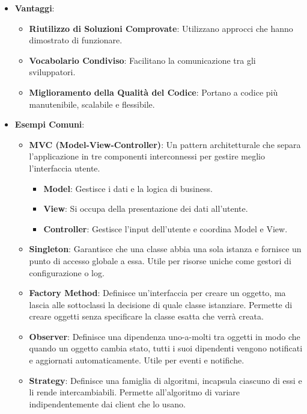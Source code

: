 \begin{itemize}
    \item \textbf{Vantaggi}:
    \begin{itemize}
        \item \textbf{Riutilizzo di Soluzioni Comprovate}: Utilizzano approcci che hanno dimostrato di funzionare.
        \item \textbf{Vocabolario Condiviso}: Facilitano la comunicazione tra gli sviluppatori.
        \item \textbf{Miglioramento della Qualità del Codice}: Portano a codice più manutenibile, scalabile e flessibile.
    \end{itemize}
    \item \textbf{Esempi Comuni}:
    \begin{itemize}
        \item \textbf{MVC (Model-View-Controller)}: Un pattern architetturale che separa l'applicazione in tre componenti interconnessi per gestire meglio l'interfaccia utente.
        \begin{itemize}
            \item \textbf{Model}: Gestisce i dati e la logica di business.
            \item \textbf{View}: Si occupa della presentazione dei dati all'utente.
            \item \textbf{Controller}: Gestisce l'input dell'utente e coordina Model e View.
        \end{itemize}
        \item \textbf{Singleton}: Garantisce che una classe abbia una sola istanza e fornisce un punto di accesso globale a essa. Utile per risorse uniche come gestori di configurazione o log.
        \item \textbf{Factory Method}: Definisce un'interfaccia per creare un oggetto, ma lascia alle sottoclassi la decisione di quale classe istanziare. Permette di creare oggetti senza specificare la classe esatta che verrà creata.
        \item \textbf{Observer}: Definisce una dipendenza uno-a-molti tra oggetti in modo che quando un oggetto cambia stato, tutti i suoi dipendenti vengono notificati e aggiornati automaticamente. Utile per eventi e notifiche.
        \item \textbf{Strategy}: Definisce una famiglia di algoritmi, incapsula ciascuno di essi e li rende intercambiabili. Permette all'algoritmo di variare indipendentemente dai client che lo usano.
    \end{itemize}
\end{itemize}

